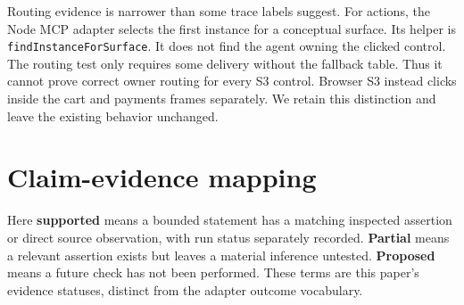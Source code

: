 \documentclass[11pt]{article}
\begin{document}
Routing evidence is narrower than some trace labels suggest. For
actions, the Node MCP adapter selects the first instance for a
conceptual surface. Its helper is \texttt{findInstanceForSurface}. It
does not find the agent owning the clicked control. The routing test
only requires some delivery without the fallback table. Thus it cannot
prove correct owner routing for every S3 control. Browser S3 instead
clicks inside the cart and payments frames separately. We retain this
distinction and leave the existing behavior unchanged.

\section{Claim-evidence mapping}\label{claim-evidence-mapping}

Here \textbf{supported} means a bounded statement has a matching
inspected assertion or direct source observation, with run status
separately recorded. \textbf{Partial} means a relevant assertion exists
but leaves a material inference untested. \textbf{Proposed} means a
future check has not been performed. These terms are this paper's
evidence statuses, distinct from the adapter outcome vocabulary.
\end{document}
